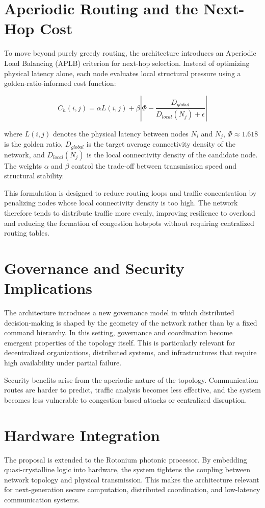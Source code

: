 \documentclass[smallextended]{svjour3}
\begin{document}
\section{Aperiodic Routing and the Next-Hop Cost}
To move beyond purely greedy routing, the architecture introduces an Aperiodic Load Balancing (APLB) criterion for next-hop selection. Instead of optimizing physical latency alone, each node evaluates local structural pressure using a golden-ratio-informed cost function:

\begin{equation}
C_h(i,j)=\alpha L(i,j)+\beta \left|\Phi - \frac{D_{global}}{D_{local}(N_j)+\epsilon}\right|
\end{equation}

where $L(i,j)$ denotes the physical latency between nodes $N_i$ and $N_j$, $\Phi \approx 1.618$ is the golden ratio, $D_{global}$ is the target average connectivity density of the network, and $D_{local}(N_j)$ is the local connectivity density of the candidate node. The weights $\alpha$ and $\beta$ control the trade-off between transmission speed and structural stability.

This formulation is designed to reduce routing loops and traffic concentration by penalizing nodes whose local connectivity density is too high. The network therefore tends to distribute traffic more evenly, improving resilience to overload and reducing the formation of congestion hotspots without requiring centralized routing tables.

\section{Governance and Security Implications}
The architecture introduces a new governance model in which distributed decision-making is shaped by the geometry of the network rather than by a fixed command hierarchy. In this setting, governance and coordination become emergent properties of the topology itself. This is particularly relevant for decentralized organizations, distributed systems, and infrastructures that require high availability under partial failure.

Security benefits arise from the aperiodic nature of the topology. Communication routes are harder to predict, traffic analysis becomes less effective, and the system becomes less vulnerable to congestion-based attacks or centralized disruption.

\section{Hardware Integration}
The proposal is extended to the Rotonium photonic processor. By embedding quasi-crystalline logic into hardware, the system tightens the coupling between network topology and physical transmission. This makes the architecture relevant for next-generation secure computation, distributed coordination, and low-latency communication systems.
\end{document}
